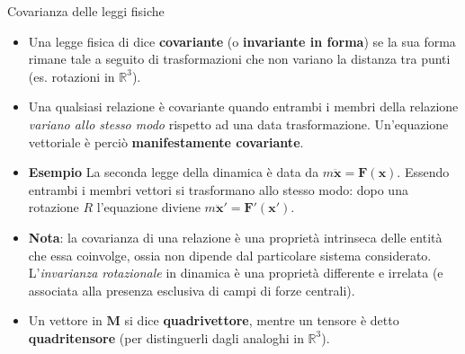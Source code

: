 \documentclass[a4_2,grid,frame]{flashcards}
\newenvironment{cartaflash}
    {\vspace{-15pt}
    \begin{itemize}
    }
    {
    \end{itemize}
    }
\begin{document}
\begin{flashcard}[Proprietà]{Covarianza delle leggi fisiche}
\begin{cartaflash}
\item Una legge fisica di dice \textbf{covariante} (o \textbf{invariante in forma}) se la sua forma rimane tale a seguito di trasformazioni che non variano la distanza tra punti (es. rotazioni in $\mathbb{R}^3$).
\item Una qualsiasi relazione è covariante quando entrambi i membri della relazione \textit{variano allo stesso modo} rispetto ad una data trasformazione. Un'equazione vettoriale è perciò \textbf{manifestamente covariante}. 
\item \textbf{Esempio} La seconda legge della dinamica è data da $m\ddot{\bm{x}} = \bm{F}(\bm{x})$. Essendo entrambi i membri vettori si trasformano allo stesso modo: dopo una rotazione $R$ l'equazione diviene $m\ddot{\bm{x}}' = \bm{F}'(\bm{x}')$.
\item \textbf{Nota}: la covarianza di una relazione è una proprietà intrinseca delle entità che essa coinvolge, ossia non dipende dal particolare sistema considerato. L'\textit{invarianza rotazionale} in dinamica è una proprietà differente e irrelata (e associata alla presenza esclusiva di campi di forze centrali).
\item Un vettore in $\bm{M}$ si dice \textbf{quadrivettore}, mentre un tensore è detto \textbf{quadritensore} (per distinguerli dagli analoghi in $\mathbb{R}^3$). 
\end{cartaflash}
\end{flashcard}
\end{document}
